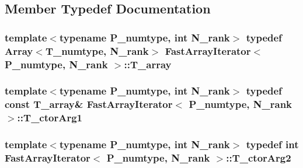 \subsection{Member Typedef Documentation}
\hypertarget{classFastArrayIterator_a8cf906d33462b33342b5155db7087127}{}
\subsubsection[{T\+\_\+array}]{\setlength{\rightskip}{0pt plus 5cm}template$<$typename P\+\_\+numtype, int N\+\_\+rank$>$ typedef {\bf Array}$<${\bf T\+\_\+numtype}, N\+\_\+rank$>$ {\bf Fast\+Array\+Iterator}$<$ P\+\_\+numtype, N\+\_\+rank $>$\+::{\bf T\+\_\+array}}\label{classFastArrayIterator_a8cf906d33462b33342b5155db7087127}
\hypertarget{classFastArrayIterator_a78d43778efa23cdb4ed68c6de5bb13d1}{}
\subsubsection[{T\+\_\+ctor\+Arg1}]{\setlength{\rightskip}{0pt plus 5cm}template$<$typename P\+\_\+numtype, int N\+\_\+rank$>$ typedef const {\bf T\+\_\+array}\& {\bf Fast\+Array\+Iterator}$<$ P\+\_\+numtype, N\+\_\+rank $>$\+::{\bf T\+\_\+ctor\+Arg1}}\label{classFastArrayIterator_a78d43778efa23cdb4ed68c6de5bb13d1}
\hypertarget{classFastArrayIterator_afc4a3171af47174bef4dcea96af02634}{}
\subsubsection[{T\+\_\+ctor\+Arg2}]{\setlength{\rightskip}{0pt plus 5cm}template$<$typename P\+\_\+numtype, int N\+\_\+rank$>$ typedef int {\bf Fast\+Array\+Iterator}$<$ P\+\_\+numtype, N\+\_\+rank $>$\+::{\bf T\+\_\+ctor\+Arg2}}\label{classFastArrayIterator_afc4a3171af47174bef4dcea96af02634}
\hypertarget{classFastArrayIterator_a93b95c134eeedaadf14d43ea36d4e06b}{}
